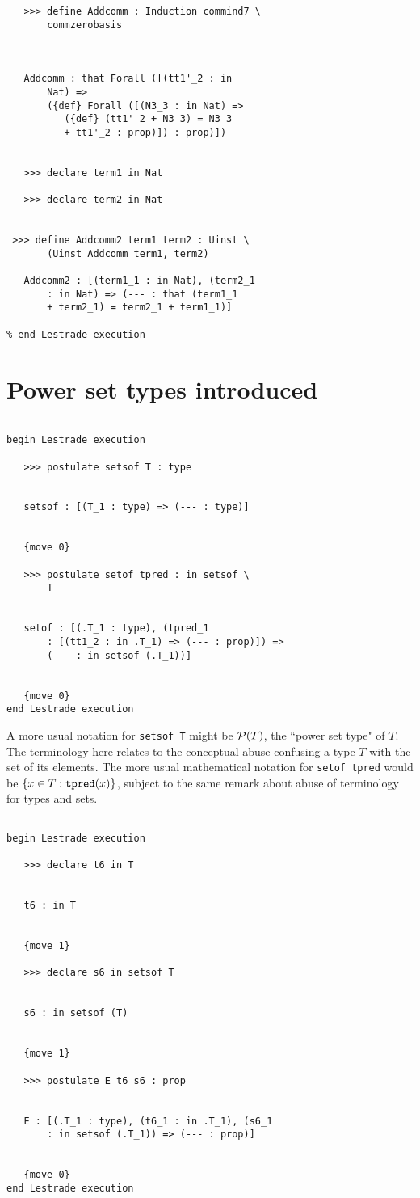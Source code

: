 \documentclass[12pt]{article}
\begin{document}
\begin{verbatim}
   >>> define Addcomm : Induction commind7 \
       commzerobasis



   Addcomm : that Forall ([(tt1'_2 : in 
       Nat) => 
       ({def} Forall ([(N3_3 : in Nat) => 
          ({def} (tt1'_2 + N3_3) = N3_3 
          + tt1'_2 : prop)]) : prop)])


   >>> declare term1 in Nat

   >>> declare term2 in Nat


 >>> define Addcomm2 term1 term2 : Uinst \
       (Uinst Addcomm term1, term2)

   Addcomm2 : [(term1_1 : in Nat), (term2_1 
       : in Nat) => (--- : that (term1_1 
       + term2_1) = term2_1 + term1_1)]

% end Lestrade execution
\end{verbatim}

\section{Power set types introduced}

\begin{verbatim}

begin Lestrade execution

   >>> postulate setsof T : type


   setsof : [(T_1 : type) => (--- : type)]


   {move 0}

   >>> postulate setof tpred : in setsof \
       T


   setof : [(.T_1 : type), (tpred_1 
       : [(tt1_2 : in .T_1) => (--- : prop)]) => 
       (--- : in setsof (.T_1))]


   {move 0}
end Lestrade execution
\end{verbatim}

A more usual notation for {\tt setsof T} might be ${\cal P}(T)$, the ``power set type" of $T$.  The terminology here relates to the conceptual abuse confusing a type $T$ with the set of its elements.  The more usual mathematical notation for {\tt setof tpred} would be $\{x \in T:{\tt tpred}(x)\}$, subject to the same remark about abuse of terminology for types and sets.

\begin{verbatim}

begin Lestrade execution

   >>> declare t6 in T


   t6 : in T


   {move 1}

   >>> declare s6 in setsof T


   s6 : in setsof (T)


   {move 1}

   >>> postulate E t6 s6 : prop


   E : [(.T_1 : type), (t6_1 : in .T_1), (s6_1 
       : in setsof (.T_1)) => (--- : prop)]


   {move 0}
end Lestrade execution
\end{verbatim}
\end{document}
